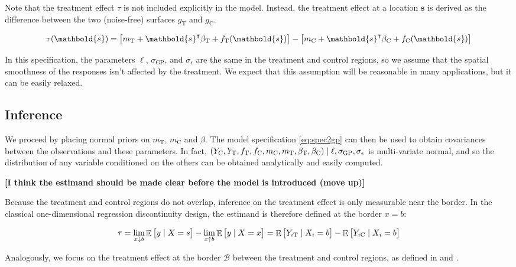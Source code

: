 \documentclass[letter]{article}
\DeclareMathOperator{\E}{\mathbb{E}}
\newcommand{\trans}{^{\intercal}}
\newcommand{\treat}{\mathrm{T}}
\newcommand{\ctrol}{\mathrm{C}}
\newcommand{\sigmaf}{\sigma_{\mathrm{GP}}}
\newcommand{\sigman}{\sigma_{\epsilon}}
\newcommand{\svec}{\mathbold{s}}
\newcommand{\border}{\mathcal{B}}
\newcommand{\eqlabel}[1]{\label{#1}}
\renewcommand{\cite}[1]{\citep{#1}}
\begin{document}
    	Note that the treatment effect \(\tau\) is not included explicitly in the model. Instead, the treatment effect at a location \(\svec\) is derived as the difference between the two (noise-free) surfaces \(g_\treat{}\) and \(g_\ctrol{}\).

\begin{equation}
\tau(\svec) = \sbr{m_\treat{} + \svec\trans\beta_\treat{} + f_\treat{}(\svec)} - \sbr{m_\ctrol{} + \svec\trans\beta_\ctrol{} + f_\ctrol{}(\svec)}
\end{equation}

In this specification, the parameters \(\ell\), \(\sigmaf\), and \(\sigman\) are the same in the treatment and control regions, so we assume that the spatial smoothness of the responses isn't affected by the treatment.
We expect that this assumption will be reasonable in many applications, but it can be easily relaxed.
    


    	\subsection{Inference}\label{inference}

We proceed by placing normal priors on \(m_\treat\), \(m_\ctrol\) and \(\beta\).
The model specification \eqref{eq:spec2gp} can then be used to obtain covariances between the observations and these parameters.
In fact, \(\del{Y_{\ctrol},Y_{\treat},f_{\treat},f_{\ctrol},m_{\ctrol},m_{\treat},\beta_{\treat}, \beta_{\ctrol}} \mid \ell,\sigmaf, \sigman\) is multi-variate normal, and so the distribution of any variable conditioned on the others can be obtained analytically and easily computed.
    


    	\textbf{{[}I think the estimand should be made clear before the model is introduced (move up){]}}

Because the treatment and control regions do not overlap, inference on the treatment effect is only measurable near the border. In the classical one-dimensional regression discontinuity design, the estimand is therefore defined at the border \(x=b\):

\begin{equation}
\eqlabel{eq:rdd_univ_estimand}
\tau = \lim_{x \downarrow b} \E\sbr{y \mid X=s} - \lim_{x \uparrow b} \E\sbr{y \mid X=x} = \E\sbr{Y_{i\treat} \mid X_i=b} - \E\sbr{Y_{i\ctrol} \mid X_i=b}
\end{equation}

Analogously, we focus on the treatment effect at the border \(\border\) between the treatment and control regions, as defined in \cite{imbens2011regression} and \cite{keeleoverview}.
\end{document}
